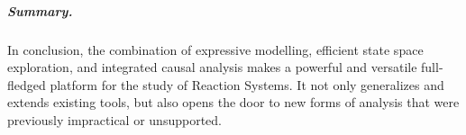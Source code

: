 \subparagraph*{Summary.}
In conclusion, the combination of expressive modelling, efficient state space exploration, and integrated causal analysis makes \GROOVE a powerful and versatile full-fledged platform for the study of Reaction Systems. It not only generalizes and extends existing tools, but also opens the door to new forms of analysis that were previously impractical or unsupported.










